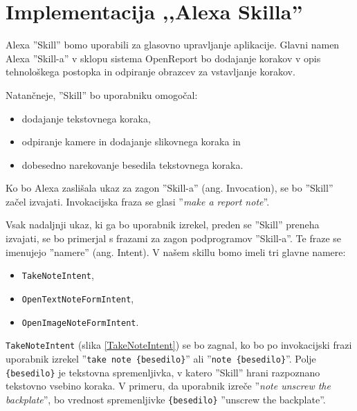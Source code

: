 \documentclass[a4paper, 12pt]{book}
\begin{document}
\section{Implementacija ,,Alexa Skilla''}

Alexa ''Skill'' bomo uporabili za glasovno upravljanje aplikacije.
Glavni namen Alexa ''Skill-a'' v sklopu sistema OpenReport bo dodajanje korakov v opis tehnološkega postopka in odpiranje obrazcev za vstavljanje korakov.

\noindent Natančneje, ''Skill'' bo uporabniku omogočal:
\begin{itemize}
	\item dodajanje tekstovnega koraka,
	\item odpiranje kamere in dodajanje slikovnega koraka in
	\item dobesedno narekovanje besedila tekstovnega koraka.
\end{itemize}

Ko bo Alexa zaslišala ukaz za zagon ''Skill-a'' (ang. Invocation), se bo ''Skill'' začel izvajati.
Invokacijska fraza se glasi ''\textit{make a report note}''.

Vsak nadaljnji ukaz, ki ga bo uporabnik izrekel, preden se ''Skill'' preneha izvajati, se bo primerjal s frazami za zagon podprogramov ''Skill-a''.
Te fraze se imenujejo ''namere'' (ang. Intent).
V našem skillu bomo imeli tri glavne namere:

\begin{itemize}
	\item \texttt{TakeNoteIntent},
	\item \texttt{OpenTextNoteFormIntent},
	\item \texttt{OpenImageNoteFormIntent}.
\end{itemize}

\texttt{TakeNoteIntent} (slika \ref{TakeNoteIntent}) se bo zagnal, ko bo po invokacijski frazi uporabnik izrekel ''\texttt{take note \{besedilo\}}'' ali ''\texttt{note \{besedilo\}}''.
Polje \texttt{\{besedilo\}} je tekstovna spremenljivka, v katero ''Skill'' hrani razpoznano tekstovno vsebino koraka.
V primeru, da uporabnik izreče ''\textit{note unscrew the backplate}'', bo vrednost spremenljivke \texttt{\{besedilo\}} ''unscrew the backplate''.
\end{document}
